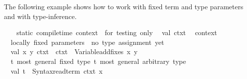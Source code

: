 \begin{isabellebody}
\begin{isamarkuptext}
\begin{description}
  \end{description}%
\end{isamarkuptext}%
\isamarkuptrue%
%
\endisatagmlref
{\isafoldmlref}%
%
\isadelimmlref
%
\endisadelimmlref
%
\isadelimmlex
%
\endisadelimmlex
%
\isatagmlex
%
\begin{isamarkuptext}%
The following example shows how to work with fixed term
  and type parameters and with type-inference.%
\end{isamarkuptext}%
\isamarkuptrue%
%
\endisatagmlex
{\isafoldmlex}%
%
\isadelimmlex
%
\endisadelimmlex
%
\isadelimML
%
\endisadelimML
%
\isatagML
{}\isamarkupfalse%
\ {}\isanewline
\ \ {}{}static\ compile{}time\ context\ {}{}\ for\ testing\ only{}{}\isanewline
\ \ val\ ctxt{}\ {}\ %
\isaantiq
context{}%
\endisaantiq
{}\isanewline
\isanewline
\ \ {}{}locally\ fixed\ parameters\ {}{}\ no\ type\ assignment\ yet{}{}\isanewline
\ \ val\ {}{}x{}\ y{}{}\ ctxt{}{}\ {}\ ctxt{}\ {}{}\ Variable{}add{}fixes\ {}{}x{}{}\ {}y{}{}{}\isanewline
\isanewline
\ \ {}{}t{}{}\ most\ general\ fixed\ type{}\ t{}{}{}\ most\ general\ arbitrary\ type{}{}\isanewline
\ \ val\ t{}\ {}\ Syntax{}read{}term\ ctxt{}\ {}x{}{}\isanewline

\end{isabellebody}
